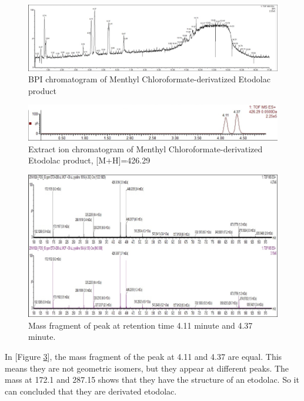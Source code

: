 \documentclass[12pt]{article} %
\begin{document}
\begin{figure}[h]
  \includegraphics[width=\linewidth]{bpi.png}
  \caption{BPI chromatogram of Menthyl Chloroformate-derivatized Etodolac product }
  \label{fig:fig2}
\end{figure}
\begin{figure}[h]
  \includegraphics[width=\linewidth]{fig3.png}
  \caption{Extract ion chromatogram of Menthyl Chloroformate-derivatized Etodolac product, [M+H]=426.29}
  \label{fig:fig3}
\end{figure}
\begin{figure}[h!]
  \includegraphics[width=\linewidth]{fig4.png}
  \caption{Mass fragment of peak at retention time 4.11 minute and 4.37 minute.}
  \label{fig:fig4}
\end{figure}

In [Figure \ref{fig:fig4}], the mass fragment of the peak at 4.11 and 4.37 are equal. This means they are not geometric isomers, but they appear at different peaks. The mass at 172.1 and 287.15 shows that they have the structure of an etodolac.\cite{cite3} So it can concluded that they are derivated etodolac. 
\end{document}
